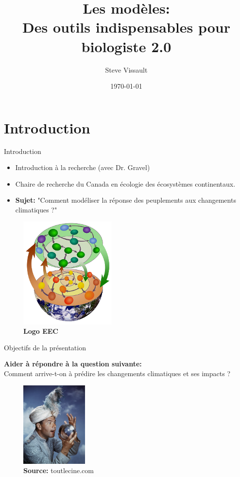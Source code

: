 \documentclass{eecslides}
\title[Les modèles]{\textbf{Les modèles:\\}Des outils indispensables pour biologiste 2.0}
\author[SV]{Steve Vissault}
\institute[Chaire de recherche EEC]{\textbf{Chaire de recherche en écologie des écosystèmes continentaux}}
\date{\today}
\begin{document}
	\begin{frame}[plain]
		\titlepage
	\end{frame}


	\section{Introduction}
	\begin{frame}{Introduction}
	    		  
		    \begin{itemize}
			\item Introduction à la recherche (avec Dr. Gravel)
			\item Chaire de recherche du Canada en écologie des écosystèmes continentaux.
			\item \textbf{Sujet:} "Comment modéliser la réponse des peuplements aux changements climatiques ?"
		    \end{itemize}
		    
		\begin{figure}
			\includegraphics[width=0.2\linewidth]{logoCREEC.png}
			\caption*{\scriptsize \alert{\textbf{Logo EEC}}} 
		\end{figure}

	\end{frame}
	\begin{frame}{Objectifs de la présentation}
	    
	\textbf{\alert{Aider à répondre à la question suivante:}} \\
	Comment arrive-t-on à prédire les changements climatiques et ses impacts ?\\

	\pause
	\vfill

	\begin{figure}
		\includegraphics[width=0.3\textwidth]{boule.jpg}
	         	\caption*{\scriptsize{\textbf{Source:} toutlecine.com}}
	\end{figure}

	\end{frame}
\end{document}

